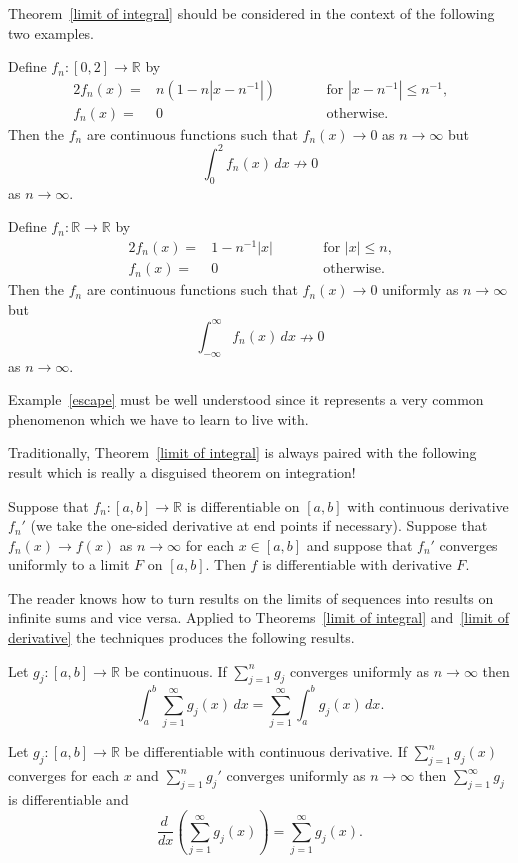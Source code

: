 Theorem~\ref{limit of integral} should be considered
in the context of the following two examples.
\begin{example} Define 
$f_{n}:[0,2]\rightarrow{\mathbb R}$ by
\begin{alignat*}{2}
f_{n}(x)=&n(1-n|x-n^{-1}|)&&\qquad
\text{for $|x-n^{-1}|\leq n^{-1}$,}\\
f_{n}(x)=&0&&\qquad\text{otherwise.}
\end{alignat*}
Then the $f_{n}$ are continuous functions such that
$f_{n}(x)\rightarrow 0$ as $n\rightarrow \infty$
but
\[\int_{0}^{2}f_{n}(x)\,dx\nrightarrow  0\]
as $n\rightarrow\infty$.
\end{example}
\begin{example}\label{escape}
Define 
$f_{n}:{\mathbb R}\rightarrow{\mathbb R}$ by
\begin{alignat*}{2}
f_{n}(x)=&1-n^{-1}|x|&&\qquad
\text{for $|x|\leq n$,}\\
f_{n}(x)=&0&&\qquad\text{otherwise.}
\end{alignat*}
Then the $f_{n}$ are continuous functions such that
$f_{n}(x)\rightarrow 0$ uniformly as $n\rightarrow \infty$
but
\[\int_{-\infty}^{\infty}f_{n}(x)\,dx\nrightarrow  0\]
as $n\rightarrow\infty$.
\end{example}
Example~\ref{escape} must be well understood since
it represents a very common phenomenon which we
have to learn to live with.

Traditionally, Theorem~\ref{limit of integral}
is always paired with the following result
which is really a disguised theorem on integration!
\begin{theorem}\label{limit of derivative}
Suppose that 
$f_{n}:[a,b]\rightarrow{\mathbb R}$ is differentiable
on $[a,b]$ with continuous derivative $f_{n}'$
(we take the one-sided derivative at end points 
if necessary). Suppose that $f_{n}(x)\rightarrow f(x)$
as $n\rightarrow\infty$ for each $x\in [a,b]$
and suppose that $f_{n}'$ converges uniformly
to a limit $F$ on $[a,b]$. Then $f$ is differentiable
with derivative $F$.
\end{theorem}

The reader knows how to turn results on the limits of
sequences into results on infinite sums and vice versa.
Applied to Theorems~\ref{limit of integral} 
and~\ref{limit of derivative} the techniques produces
the following results.
\begin{theorem} Let 
$g_{j}:[a,b]\rightarrow{\mathbb R}$ be continuous.
If $\sum_{j=1}^{n}g_{j}$ converges uniformly as 
$n\rightarrow\infty$ then
\[\int_{a}^{b}\sum_{j=1}^{\infty}g_{j}(x)\,dx
=\sum_{j=1}^{\infty}\int_{a}^{b}g_{j}(x)\,dx.\]
\end{theorem}
\begin{theorem}
Let $g_{j}:[a,b]\rightarrow{\mathbb R}$ be differentiable
with continuous derivative. If $\sum_{j=1}^{n}g_{j}(x)$
converges for each $x$ and 
$\sum_{j=1}^{n}g_{j}'$ converges uniformly as 
$n\rightarrow\infty$ then $\sum_{j=1}^{\infty}g_{j}$ is
differentiable and
\[\frac{d\ }{dx}\left(\sum_{j=1}^{\infty}g_{j}(x)\right)
=\sum_{j=1}^{\infty}g_{j}(x).\]
\end{theorem}

